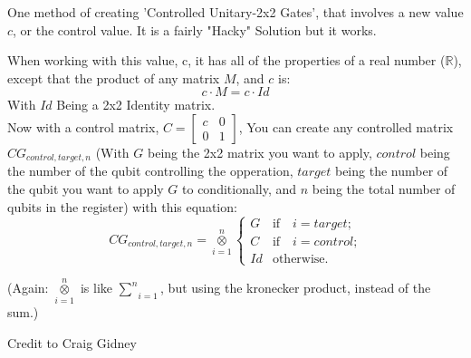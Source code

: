 \documentclass[../main.tex]{subfiles}
\begin{document}
One method of creating 'Controlled Unitary-2x2 Gates',
that involves a new value \(c\), or the control value. It is a fairly "Hacky" Solution but it works.

When working with this value, c, it has all of the properties of a real number (\(\mathbb{R}\)), except that the product of any matrix \(M\), and \(c\) is:
\begin{equation}
	c \cdot M = c \cdot Id
\end{equation}
With \(Id\) Being a 2x2 Identity matrix. \\
Now with a control matrix, \(C = \begin{bmatrix} c & 0 \\ 0 & 1\end{bmatrix}\), You can create any controlled matrix \(CG_{control, target, n}\) (With \(G\) being the 2x2 matrix you want to apply, \(control\) being the number of the qubit controlling the opperation, \(target\) being the number of the qubit you want to apply \(G\) to conditionally, and \(n\) being the total number of qubits in the register) with this equation:
\begin{equation}
	CG_{control, target, n} = \underset{i=1}{\overset{n}{\otimes}}
	\begin{cases}
    	G & \text{if} \quad i = target\text{;} \\
    	C & \text{if} \quad i = control\text{;} \\
    	Id & \text{otherwise.} 
	\end{cases}
\end{equation}

(Again: \(\underset{i=1}{\overset{n}{\otimes}}\) is like \(\underset{i=1}{\overset{n}{\sum}}\), but using the kronecker product, instead of the sum.)

Credit to Craig Gidney \cite{controlslikevalues}
\end{document}
